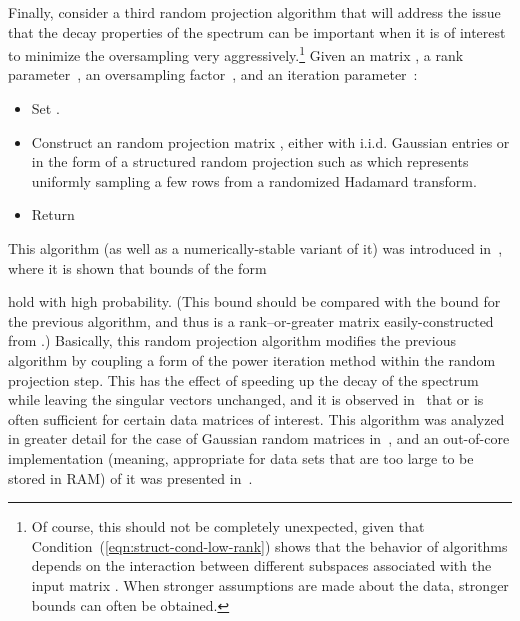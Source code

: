 \documentclass[twoside]{article}
\begin{document}
Finally, consider a third random projection algorithm that will address the 
issue that the decay properties of the spectrum can be important when it is 
of interest to minimize the oversampling very aggressively.\footnote{Of course, this should not be completely unexpected, given that 
Condition~(\ref{eqn:struct-cond-low-rank}) shows that the behavior of 
algorithms depends on the interaction between different subspaces 
associated with the input matrix .  When stronger assumptions are made
about the data, stronger bounds can often be obtained.} 
Given an  matrix , a rank parameter~, an oversampling
factor~, and an iteration parameter~:
\begin{itemize}
\item
Set .
\item
Construct an  random projection matrix , either with 
i.i.d.  Gaussian entries or in the form of a structured random projection 
such as  which represents uniformly sampling a few rows from 
a randomized Hadamard transform.
\item
Return 
\end{itemize}
This algorithm (as well as a numerically-stable variant of it) was 
introduced in~\cite{RST09}, where it is shown that bounds of the form

hold with high probability.
(This bound should be compared with the bound for the previous algorithm, and 
thus  is a rank--or-greater matrix easily-constructed from .)
Basically, this random projection algorithm modifies the previous algorithm 
by coupling a form of the power iteration method within the random 
projection step.
This has the effect of speeding up the decay of the spectrum while leaving 
the singular vectors unchanged, and it is observed in~\cite{RST09,HMT09_SIREV} 
that  or  is often sufficient for certain data matrices of 
interest.
This algorithm was analyzed in greater detail for the case of Gaussian 
random matrices in~\cite{HMT09_SIREV}, and an out-of-core implementation (meaning, 
appropriate for data sets that are too large to be stored in RAM) of it was 
presented in~\cite{HMST10_TR}.
\end{document}
